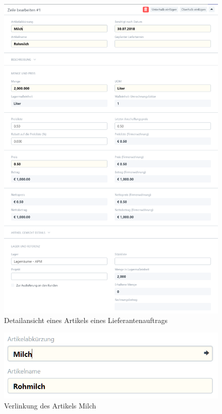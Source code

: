 \begin{figure}
  \centering
  \includegraphics[width=\textwidth]{Bilder/Lieferantenauftrag_Produktdetail.PNG}
  \caption{Detailansicht eines Artikels eines Lieferantenauftrags}
  \label{fig:auftrDetail}
\end{figure}
\begin{figure}
  \centering
  \includegraphics[width=\textwidth]{Bilder/Milch_Link.PNG}
  \caption{Verlinkung des Artikels Milch}
  \label{fig:verlArtikel}
\end{figure}
